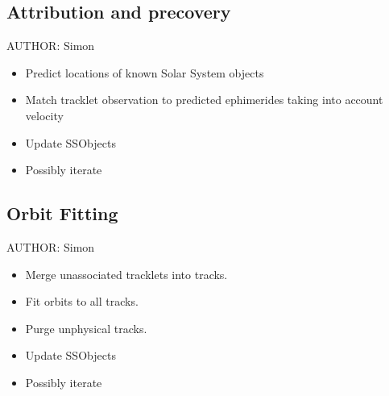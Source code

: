 \subsection{Attribution and precovery}
AUTHOR: Simon
\begin{itemize}
\item Predict locations of known Solar System objects
\item Match tracklet observation to predicted ephimerides taking into account velocity
\item Update SSObjects
\item Possibly iterate
\end{itemize}

\subsection{Orbit Fitting}
AUTHOR: Simon
\begin{itemize}
\item Merge unassociated tracklets into tracks.
\item Fit orbits to all tracks.
\item Purge unphysical tracks.
\item Update SSObjects
\item Possibly iterate
\end{itemize}
